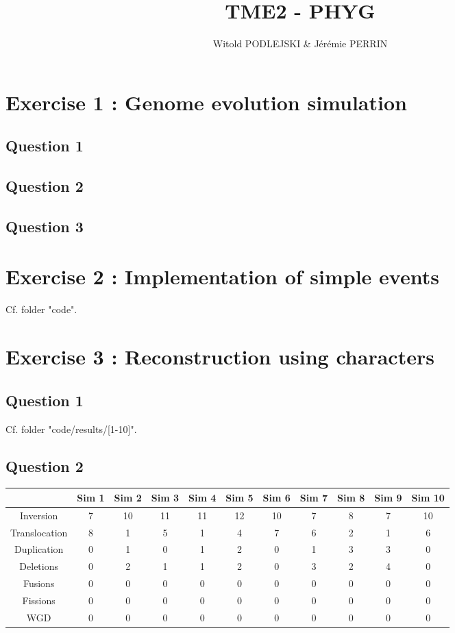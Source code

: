 \documentclass[]{article}
\title{TME2 - PHYG}
\author{Witold PODLEJSKI \& Jérémie PERRIN}
\theoremstyle{definition}
\begin{document}
\maketitle

\section{Exercise 1 : Genome evolution simulation}
\subsection{Question 1}

 
\subsection{Question 2}


\subsection{Question 3}

\section{Exercise 2 : Implementation of simple events}
Cf. folder "code".

\section{Exercise 3 : Reconstruction using characters}
\subsection{Question 1}

Cf. folder "code/results/[1-10]".

\subsection{Question 2}

\begin{tabular}{|*{11}{c|}}
	\hline
	& Sim 1  & Sim 2  & Sim 3  & Sim 4 & Sim 5 & Sim 6 & Sim 7 & Sim 8 & Sim 9 & Sim 10 \\
	\hline
	Inversion  & 7  & 10  & 11  & 11 & 12 & 10 & 7 & 8 &7&10 \\
	\hline
	Translocation &8&1&5&1&4&7&6&2&1&6 \\
	\hline
	Duplication  & 0&1&0&1&2&0&1&3&3&0 \\
	\hline
	Deletions  & 0&2&1&1&2&0&3&2&4&0 \\
	\hline
	Fusions   &0&0&0&0&0&0&0&0&0&0 \\
	\hline
	Fissions &0&0&0&0&0&0&0&0&0&0 \\
	\hline
	WGD  &0&0&0&0&0&0&0&0&0&0 \\
	\hline
\end{tabular}
\end{document}
